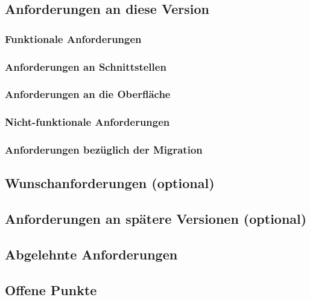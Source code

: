 \documentclass[12pt]{article}
\begin{document}
\subsection{Anforderungen an diese Version}
\subsubsection{Funktionale Anforderungen}
\subsubsection{Anforderungen an Schnittstellen}
\subsubsection{Anforderungen an die Oberfläche}
\subsubsection{Nicht-funktionale Anforderungen}
\subsubsection{Anforderungen bezüglich der Migration}

\subsection{Wunschanforderungen (optional)}

\subsection{Anforderungen an spätere Versionen (optional)}

\subsection{Abgelehnte Anforderungen}

\subsection{Offene Punkte}
\end{document}
